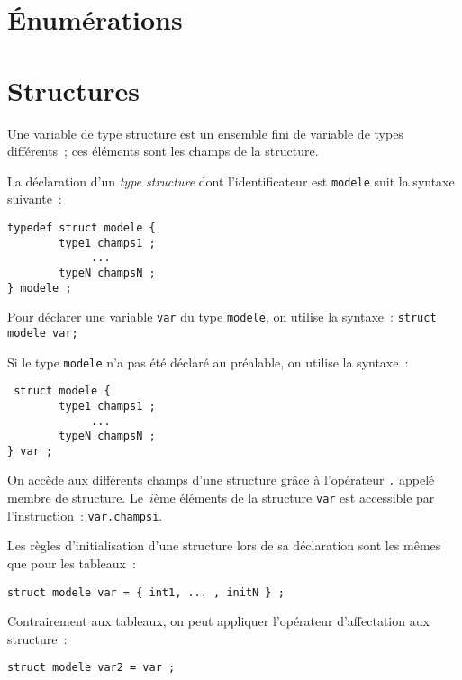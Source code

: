 \section{\'Enum\'erations}
\label{sec:Enumerations}
\section{Structures}
\label{sec:Structures}
Une variable  de type  structure est  un ensemble  fini de variable de
types diff\'erents~; ces \'el\'ements sont les champs de la structure.
\par{}
La d\'eclaration  d'un \textit{type structure}  dont  l'identificateur
est \texttt{modele} suit la syntaxe suivante~:
\begin{verbatim}
typedef struct modele {
        type1 champs1 ;
             ...
        typeN champsN ;
} modele ;
\end{verbatim}
Pour d\'eclarer une  variable \texttt{var} du type \texttt{modele}, on
utilise la syntaxe~: \texttt{struct modele var;}
\par
Si le type \texttt{modele} n'a pas \'et\'e d\'eclar\'e au pr\'ealable,
on utilise la syntaxe~:
\begin{verbatim}
 struct modele {
        type1 champs1 ;
             ...
        typeN champsN ;
} var ;
\end{verbatim}
On   acc\`ede  aux diff\'erents   champs  d'une structure  gr\^ace \`a
l'op\'erateur  \texttt{.}  appel\'e membre  de structure.  Le~$i$\`eme
\'el\'ements de   la structure   \texttt{var}  est accessible    par
l'instruction~: \texttt{var.champsi}.
\par
Les r\`egles d'initialisation d'une structure lors de sa d\'eclaration
sont les m\^emes que pour les tableaux~:
\begin{verbatim}
struct modele var = { int1, ... , initN } ;
\end{verbatim}
Contrairement  aux  tableaux,   on    peut   appliquer   l'op\'erateur
d'affectation aux structure~:
\begin{verbatim}
struct modele var2 = var ;
\end{verbatim}
